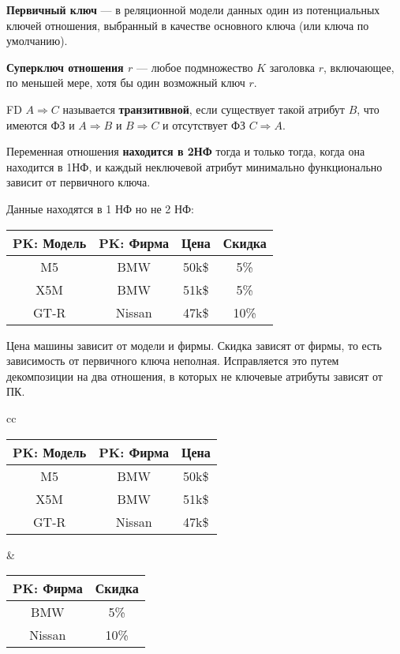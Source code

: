 \textbf{Первичный ключ} --- в реляционной модели данных один из потенциальных ключей отношения, выбранный в качестве основного ключа (или ключа по умолчанию).

\textbf{Суперключ отношения $r$} --- любое подмножество $K$ заголовка $r$, включающее, по меньшей мере, хотя бы один возможный ключ $r$.

FD $A \Rightarrow C$ называется \textbf{транзитивной}, если существует такой атрибут $B$, что имеются ФЗ и $A \Rightarrow B$ и $B \Rightarrow C$ и отсутствует ФЗ $C \Rightarrow A$.

Переменная отношения \textbf{находится в 2НФ} тогда и только тогда, когда она находится в 1НФ, и каждый неключевой атрибут минимально функционально зависит от первичного ключа.

Данные находятся в 1 НФ но не 2 НФ:

\begin{tabular}{|c|c|c|c|}
    \hline
    \textbf{PK: Модель} & \textbf{PK: Фирма} & Цена & Скидка \\
    \hline
    \hline
    M5  & BMW     & 50k\$ & 5\% \\
    \hline
    X5M & BMW     & 51k\$ & 5\% \\
    \hline
    GT-R & Nissan & 47k\$ & 10\% \\
    \hline
\end{tabular}

Цена машины зависит от модели и фирмы. Скидка зависят от фирмы, то есть зависимость от первичного ключа неполная. Исправляется это путем декомпозиции на два отношения, в которых не ключевые атрибуты зависят от ПК.

\begin{tabular}{cc}
    \begin{minipage}{.55\linewidth}
    
        \begin{tabular}{|c|c|c|}
            \hline
            \textbf{PK: Модель} & \textbf{PK: Фирма} & Цена \\
            \hline
            \hline
            M5  & BMW     & 50k\$ \\
            \hline
            X5M & BMW     & 51k\$ \\
            \hline
            GT-R & Nissan & 47k\$ \\
            \hline
        \end{tabular}

    \end{minipage} &
    \begin{minipage}{.55\linewidth}
    
        \begin{tabular}{|c|c|}
            \hline
            \textbf{PK: Фирма} & Скидка \\
            \hline
            \hline
            BMW     & 5\% \\
            \hline
            Nissan  & 10\% \\
            \hline
        \end{tabular}
        
    \end{minipage} 
\end{tabular}

